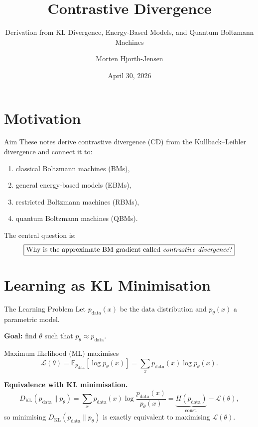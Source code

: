 \documentclass[aspectratio=169]{beamer}
\title{Contrastive Divergence}
\subtitle{Derivation from KL Divergence, Energy-Based Models, and Quantum Boltzmann Machines}
\author{Morten Hjorth-Jensen}
\date{April 30, 2026}
\newcommand{\E}{\mathbb{E}}
\newcommand{\pdata}{p_{\mathrm{data}}}
\newcommand{\pmodel}{p_{\theta}}
\newcommand{\DKL}{D_{\mathrm{KL}}}
\begin{document}
\frame{\titlepage}

\section{Motivation}

\begin{frame}{Aim}
These notes derive contrastive divergence (CD) from the Kullback--Leibler
divergence and connect it to:
\begin{enumerate}
  \item classical Boltzmann machines (BMs),
  \item general energy-based models (EBMs),
  \item restricted Boltzmann machines (RBMs),
  \item quantum Boltzmann machines (QBMs).
\end{enumerate}

The central question is:
\[
  \boxed{\text{Why is the approximate BM gradient called
  \emph{contrastive divergence}?}}
\]
\end{frame}

\section{Learning as KL Minimisation}

\begin{frame}{The Learning Problem}
Let $\pdata(x)$ be the data distribution and $\pmodel(x)$ a parametric model.

\textbf{Goal:} find $\theta$ such that $\pmodel \approx \pdata$.

\medskip
Maximum likelihood (ML) maximises
\[
  \mathcal{L}(\theta)
  = \E_{\pdata}[\log \pmodel(x)]
  = \sum_x \pdata(x)\log\pmodel(x).
\]

\medskip
\textbf{Equivalence with KL minimisation.}
\[
  \DKL(\pdata\|\pmodel)
  = \sum_x \pdata(x)\log\frac{\pdata(x)}{\pmodel(x)}
  = \underbrace{H(\pdata)}_{\text{const.}} - \mathcal{L}(\theta),
\]
so minimising $\DKL(\pdata\|\pmodel)$ is exactly equivalent to maximising $\mathcal{L}(\theta)$.
\end{frame}
\end{document}
